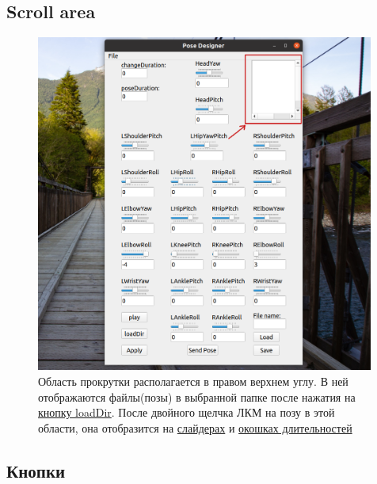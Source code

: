 \documentclass[12pt,a4paper]{article}
\begin{document}
\subsection{Scroll area}
\label{scroll}
\begin{figure}[h!]
    \centering
    \includegraphics[width=0.99\textwidth]{images/scroll.png}
    \caption{Область прокрутки располагается в правом верхнем углу. В ней отображаются файлы(позы) в выбранной папке  после нажатия на \hyperref[loadDir]{кнопку loadDir}. После двойного щелчка ЛКМ на позу в этой области, она отобразится на \hyperref[sliders]{слайдерах} и \hyperref[durations]{окошках длительностей} }
    \label{fig:file}
\end{figure}
\newpage
\subsection{Кнопки}
\end{document}
